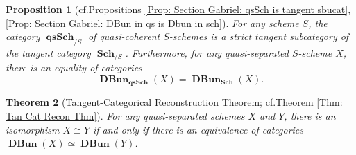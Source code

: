 \documentclass{amsart}
\newtheorem{thmx}{Theorem}
\newtheorem{propx}[thmx]{Proposition}
\theoremstyle{definition}
\DeclareMathOperator{\qsSch}{\mathbf{qsSch}}
\DeclareMathOperator{\Sch}{\mathbf{Sch}}
\DeclareMathOperator{\DBun}{\mathbf{DBun}}
\numberwithin{equation}{subsection}
\begin{document}
\begin{propx}[cf.\@ Propositions \ref{Prop: Section Gabriel: qsSch is tangent sbucat}, \ref{Prop: Section Gabriel: DBun in qs is Dbun in sch}]
For any scheme $S$, the category $\qsSch_{/S}$ of quasi-coherent $S$-schemes is a strict tangent subcategory of the tangent category $\Sch_{/S}$. Furthermore, for any quasi-separated $S$-scheme $X$, there is an equality of categories
\[
\DBun_{\qsSch}(X) = \DBun_{\Sch}(X).
\]
\end{propx}

\begin{thmx}[Tangent-Categorical Reconstruction Theorem; cf.\@ Theorem \ref{Thm: Tan Cat Recon Thm}]
For any quasi-separated schemes $X$ and $Y$, there is an isomorphism $X \cong Y$ if and only if there is an equivalence of categories $\DBun(X) \simeq \DBun(Y)$.
\end{thmx}







%
%
%
%
%
%
\end{document}
